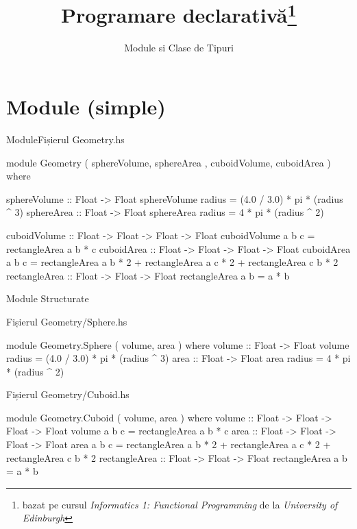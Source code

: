 \documentclass[xcolor=pdftex,romanian,colorlinks]{beamer}
\title[PD---Module si Tipuri]{Programare declarativă\thanks{bazat pe cursul \emph{Informatics 1: Functional Programming} de la \emph{University of Edinburgh}}}
\subtitle{Module si Clase de Tipuri}
\begin{document}
\begin{frame}
  \titlepage
\end{frame}

\section{Module (simple)}

\begin{frame}[fragile]{Module}{Fișierul Geometry.hs}
\begin{asciihs}
module Geometry 
( sphereVolume, sphereArea  
, cuboidVolume, cuboidArea
) where  
      
sphereVolume :: Float -> Float  
sphereVolume radius = (4.0 / 3.0) * pi * (radius ^ 3)  
sphereArea :: Float -> Float  
sphereArea radius = 4 * pi * (radius ^ 2)  

cuboidVolume :: Float -> Float -> Float -> Float  
cuboidVolume a b c = rectangleArea a b * c  
cuboidArea :: Float -> Float -> Float -> Float  
cuboidArea a b c = rectangleArea a b * 2 +
    rectangleArea a c * 2 + rectangleArea c b * 2  
rectangleArea :: Float -> Float -> Float  
rectangleArea a b = a * b  
\end{asciihs}
\end{frame}


\begin{frame}[fragile]{Module Structurate}
\begin{block}
{Fișierul Geometry/Sphere.hs}
\vspace{-2ex}
\begin{asciihs}
module Geometry.Sphere ( volume, area ) where  
volume :: Float -> Float  
volume radius = (4.0 / 3.0) * pi * (radius ^ 3)  
area :: Float -> Float  
area radius = 4 * pi * (radius ^ 2)  
\end{asciihs}
\end{block}
\begin{block}
{Fișierul Geometry/Cuboid.hs}
\vspace{-2ex}
\begin{asciihs}
module Geometry.Cuboid ( volume, area ) where  
volume :: Float -> Float -> Float -> Float  
volume a b c = rectangleArea a b * c  
area :: Float -> Float -> Float -> Float  
area a b c = rectangleArea a b * 2 +
    rectangleArea a c * 2 + rectangleArea c b * 2  
rectangleArea :: Float -> Float -> Float  
rectangleArea a b = a * b  
\end{asciihs}
\end{block}
\end{frame}
\end{document}
